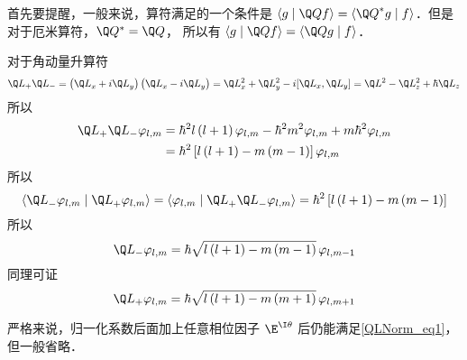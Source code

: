 


首先要提醒，一般来说，算符满足的一个条件是 $\left\langle {g}
 \mathrel{\left | {\vphantom {g {\Q Qf}}}
 \right. \kern-\nulldelimiterspace}
 {{\Q Qf}} \right\rangle  = \left\langle {{{{\Q Q}^ * }g}}
 \mathrel{\left | {\vphantom {{{{\Q Q}^ * }g} f}}
 \right. \kern-\nulldelimiterspace}
 {f} \right\rangle $．但是对于厄米算符，${\Q Q^ * } = \Q Q$， 所以有 $\left\langle {g}
 \mathrel{\left | {\vphantom {g {\Q Qf}}}
 \right. \kern-\nulldelimiterspace}
 {{\Q Qf}} \right\rangle  = \left\langle {{\Q Qg}}
 \mathrel{\left | {\vphantom {{\Q Qg} f}}
 \right. \kern-\nulldelimiterspace}
 {f} \right\rangle $．

对于角动量升算符
\begin{equation}
{\Q L_ + }{\Q L_ - } = \left( {{{\Q L}_x} + i{{\Q L}_y}} \right)\left( {{{\Q L}_x} - i{{\Q L}_y}} \right) = \Q L_x^2 + \Q L_y^2 - i[{\Q L_x},{\Q L_y}] = {\Q L^2} - \Q L_z^2 + \hbar {\Q L_z}
\end{equation} 
所以
\begin{equation}\begin{aligned}
{\Q L_ + }{\Q L_ - }{\varphi _{l,m}} &= {\hbar ^2}l\left( {l + 1} \right){\varphi _{l,m}} - {\hbar ^2}{m^2}{\varphi _{l,m}} + m{\hbar ^2}{\varphi _{l,m}} \\
&= {\hbar ^2}\left[ {l\left( {l + 1} \right) - m\left( {m - 1} \right)} \right]{\varphi _{l,m}}
\end{aligned}\end{equation} 
所以
\begin{equation}\label{QLNorm_eq1}
\left\langle {{{{\Q L}_ - }{\varphi _{l,m}}}}
 \mathrel{\left | {\vphantom {{{{\Q L}_ - }{\varphi _{l,m}}} {{{\Q L}_ + }{\varphi _{l,m}}}}}
 \right. \kern-\nulldelimiterspace}
 {{{{\Q L}_ + }{\varphi _{l,m}}}} \right\rangle  = \left\langle {{{\varphi _{l,m}}}}
 \mathrel{\left | {\vphantom {{{\varphi _{l,m}}} {{{\Q L}_ + }{{\Q L}_ - }{\varphi _{l,m}}}}}
 \right. \kern-\nulldelimiterspace}
 {{{{\Q L}_ + }{{\Q L}_ - }{\varphi _{l,m}}}} \right\rangle  = {\hbar ^2}\left[ {l\left( {l + 1} \right) - m\left( {m - 1} \right)} \right]
\end{equation} 
所以
\begin{equation}
{\Q L_ - }{\varphi _{l,m}} = \hbar \sqrt {l\left( {l + 1} \right) - m\left( {m - 1} \right)} \,{\varphi _{l,m - 1}}
\end{equation}
同理可证
\begin{equation}
{\Q L_ + }{\varphi _{l,m}} = \hbar \sqrt {l\left( {l + 1} \right) - m\left( {m + 1} \right)} \,{\varphi _{l,m + 1}}
\end{equation} 

严格来说，归一化系数后面加上任意相位因子 ${\E^{\I \theta }}$ 后仍能满足\autoref{QLNorm_eq1}， 但一般省略．



